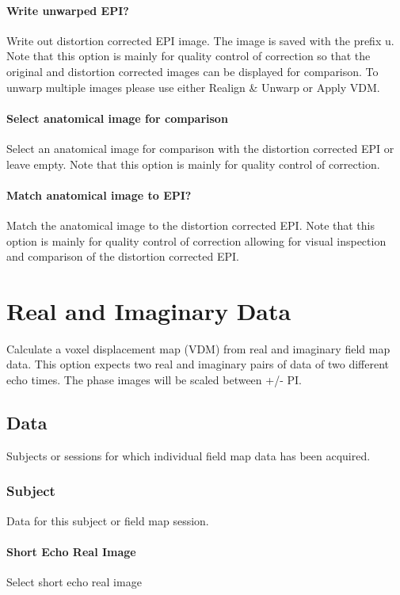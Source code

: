 \paragraph{Write unwarped EPI?}
Write out distortion corrected EPI image. The image is saved with the prefix u. Note that this option is mainly for quality control of correction so that the original and distortion corrected images can be displayed for comparison. To unwarp multiple images please use either Realign \& Unwarp or Apply VDM.


\paragraph{Select anatomical image for comparison}
Select an anatomical image for comparison with the distortion corrected EPI or leave empty. Note that this option is mainly for quality control of correction.


\paragraph{Match anatomical image to EPI?}
Match the anatomical image to the distortion corrected EPI. Note that this option is mainly for quality control of correction allowing for visual inspection and comparison of the distortion corrected EPI.


\section{Real and Imaginary Data}
Calculate a voxel displacement map (VDM) from real and imaginary field map data. This option expects two real and imaginary pairs of data of two different echo times. The phase images will be scaled between +/- PI.


\subsection{Data}
Subjects or sessions for which individual field map data has been acquired.


\subsubsection{Subject}
Data for this subject or field map session.


\paragraph{Short Echo Real Image}
Select short echo real image



